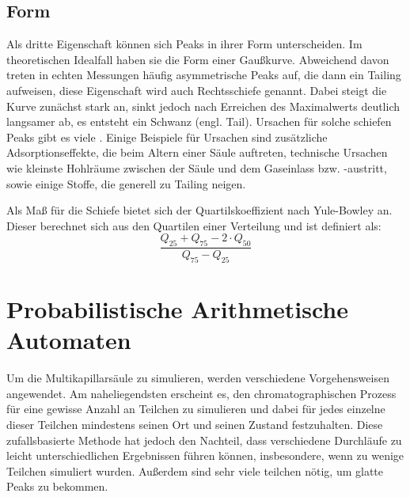 \subsection{Form}
Als dritte Eigenschaft können sich Peaks in ihrer Form unterscheiden. Im theoretischen Idealfall haben sie die Form einer Gaußkurve. %
Abweichend davon treten in echten Messungen häufig asymmetrische Peaks auf, die dann ein Tailing aufweisen, diese Eigenschaft wird auch Rechtsschiefe genannt. Dabei steigt die Kurve zunächst stark an, sinkt jedoch nach Erreichen des Maximalwerts deutlich langsamer ab, es entsteht ein Schwanz (engl. Tail).
Ursachen für solche schiefen Peaks gibt es viele \citep{kolb2003, Moretti2004, Giddings1963}. Einige Beispiele für Ursachen sind zusätzliche Adsorptionseffekte, die beim Altern einer Säule auftreten, technische Ursachen wie kleinste Hohlräume zwischen der Säule und dem Gaseinlass bzw. -austritt, sowie einige Stoffe, die generell zu Tailing neigen. %

Als Maß für die Schiefe bietet sich der Quartilskoeffizient nach Yule-Bowley an. Dieser berechnet sich aus den Quartilen einer Verteilung und ist definiert als: 
\begin{equation*}
\frac{Q_{25} + Q_{75} -2\cdot Q_{50} }{ Q_{75} - Q_{25}}
\end{equation*}


\section{Probabilistische Arithmetische Automaten}
Um die Multikapillarsäule zu simulieren, werden verschiedene Vorgehensweisen angewendet. Am naheliegendsten erscheint es, den chromatographischen Prozess für eine gewisse Anzahl an Teilchen zu simulieren und dabei für jedes einzelne dieser Teilchen mindestens seinen Ort und seinen Zustand festzuhalten. Diese zufallsbasierte Methode hat jedoch den Nachteil, dass verschiedene Durchläufe zu leicht unterschiedlichen Ergebnissen führen können, insbesondere, wenn zu wenige Teilchen simuliert wurden.
Außerdem sind sehr viele teilchen nötig, um glatte Peaks zu bekommen.

